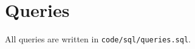 \section{Queries}

All queries are written in \texttt{code/sql/queries.sql}.

\inputminted{sql}{../code/sql/queries.sql}
